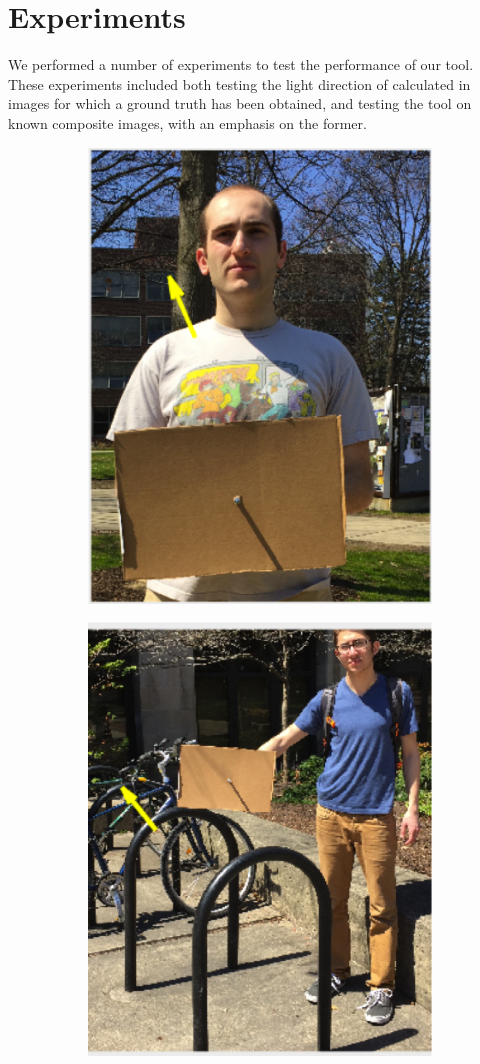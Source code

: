 \documentclass[10pt,twocolumn,letterpaper]{article}
\begin{document}
\section{Experiments}
We performed a number of experiments to test the performance of our tool. These experiments included both testing the light direction of calculated in images for which a ground truth has been obtained, and testing the tool on known composite images, with an emphasis on the former.

\begin{figure}[hbtp]
\begin{subfigure}{.5\linewidth}
  \centering
	\includegraphics[width=0.5\linewidth]{nathan.png}
  \caption{}
  \label{fig:sfig1}
\end{subfigure}
\begin{subfigure}{.5\linewidth}
  \centering
	\includegraphics[width=0.5\linewidth]{zander.png}

\end{subfigure}
\end{figure}
\end{document}
